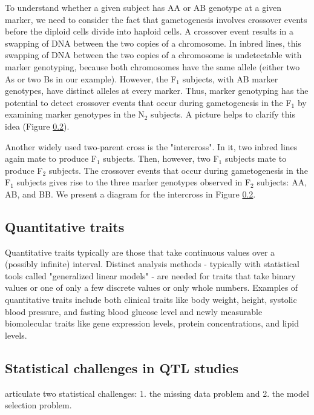 \documentclass[]{article}
\begin{document}
To understand whether a given subject has AA or AB genotype at a given marker, we need to consider the fact that gametogenesis involves crossover events before the diploid cells divide into haploid cells. A crossover event results in a swapping of DNA between the two copies of a chromosome. In inbred lines, this swapping of DNA between the two copies of a chromosome is undetectable with marker genotyping, because both chromosomes have the same allele (either two As or two Bs in our example). However, the F$_1$ subjects, with AB marker genotypes, have distinct alleles at every marker. Thus, marker genotyping has the potential to detect crossover events that occur during gametogenesis in the F$_1$ by examining marker genotypes in the N$_2$ subjects. A picture helps to clarify this idea (Figure \ref{}).


Another widely used two-parent cross is the "intercross". In it, two inbred lines again mate to produce F$_1$ subjects. Then, however, two F$_1$ subjects mate to produce F$_2$ subjects. The crossover events that occur during gametogenesis in the F$_1$ subjects gives rise to the three marker genotypes observed in F$_2$ subjects: AA, AB, and BB. We present a diagram for the intercross in Figure \ref{}.

\subsection{Quantitative traits}

Quantitative traits typically are those that take continuous values over a (possibly infinite) interval. Distinct analysis methods - typically with statistical tools called "generalized linear models" - are needed for traits that take binary values or one of only a few discrete values or only whole numbers. Examples of quantitative traits include both clinical traits like body weight, height, systolic blood pressure, and fasting blood glucose level and newly measurable biomolecular traits like gene expression levels, protein concentrations, and lipid levels. 

\subsection{Statistical challenges in QTL studies}

\citet{broman2009guide} articulate two statistical challenges: 1. the missing data problem and 2. the model selection problem. 
\end{document}
